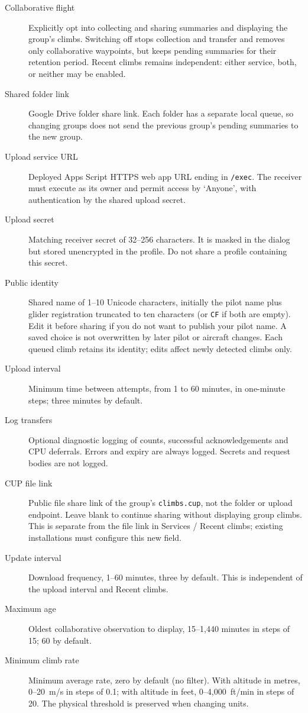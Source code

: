 \begin{description}
\item[Collaborative flight] Explicitly opt into collecting and sharing
  summaries and displaying the group's climbs. Switching off stops collection
  and transfer and removes only collaborative waypoints, but keeps pending
  summaries for their retention period. Recent climbs remains independent:
  either service, both, or neither may be enabled.
\item[Shared folder link] Google Drive folder share link. Each folder
  has a separate local queue, so changing groups does not send the previous
  group's pending summaries to the new group.
\item[Upload service URL] Deployed Apps Script HTTPS web app URL ending
  in \texttt{/exec}. The receiver must execute as its owner and permit
  access by `Anyone', with authentication by the shared upload secret.
\item[Upload secret] Matching receiver secret of 32--256 characters.
  It is masked in the dialog but stored unencrypted in the profile.
  Do not share a profile containing this secret.
\item[Public identity] Shared name of 1--10 Unicode characters, initially
  the pilot name plus glider registration truncated to ten characters
  (or \texttt{CF} if both are empty). Edit it before sharing if you do not
  want to publish your pilot name. A saved choice is not overwritten by
  later pilot or aircraft changes. Each queued climb retains its identity;
  edits affect newly detected climbs only.
\item[Upload interval] Minimum time between attempts, from 1 to 60
  minutes, in one-minute steps; three minutes by default.
\item[Log transfers] Optional diagnostic logging of counts, successful
  acknowledgements and CPU deferrals. Errors and expiry are always logged.
  Secrets and request bodies are not logged.
\item[CUP file link] Public file share link of the group's
  \texttt{climbs.cup}, not the folder or upload endpoint. Leave blank to
  continue sharing without displaying group climbs. This is separate from
  the file link in Services / Recent climbs; existing installations must
  configure this new field.
\item[Update interval] Download frequency, 1--60 minutes, three by default.
  This is independent of the upload interval and Recent climbs.
\item[Maximum age] Oldest collaborative observation to display,
  15--1,440 minutes in steps of 15; 60 by default.
\item[Minimum climb rate] Minimum average rate, zero by default (no filter).
  With altitude in metres, 0--20~m/s in steps of 0.1; with altitude in feet,
  0--4,000~ft/min in steps of 20. The physical threshold is preserved when
  changing units.
\end{description}

